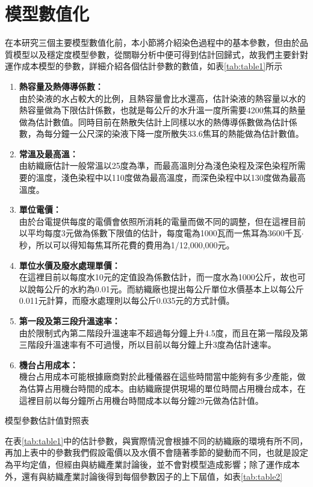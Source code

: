 \section{模型數值化}
\label{c:ch6.1}
在本研究三個主要模型數值化前，本小節將介紹染色過程中的基本參數，但由於品質模型以及穩定度模型參數，從關聯分析中便可得到估計回歸式，故我們主要針對運作成本模型的參數，詳細介紹各個估計參數的數值，如表\ref{tab:table1}所示
\begin{enumerate}[(1)]
	\item \textbf{熱容量及熱傳導係數：}\\由於染液的水占較大的比例，且熱容量會比水還高，估計染液的熱容量以水的熱容量做為下限估計係數，也就是每公斤的水升溫一度所需要4200焦耳的熱量做為估計數值。同時目前在熱散失估計上同樣以水的熱傳導係數做為估計係數，為每分鐘一公尺深的染液下降一度所散失33.6焦耳的熱能做為估計數值。
	\item \textbf{常溫及最高溫：}\\由紡織廠估計一般常溫以25度為準，而最高溫則分為淺色染程及深色染程所需要的溫度，淺色染程中以110度做為最高溫度，而深色染程中以130度做為最高溫度。
	\item \textbf{單位電價：}\\由於台電提供每度的電價會依照所消耗的電量而做不同的調整，但在這裡目前以平均每度3元做為係數下限值的估計，每度電為1000瓦而一焦耳為3600千瓦$\cdot$秒，所以可以得知每焦耳所花費的費用為1/12,000,000元。
	\item \textbf{單位水價及廢水處理單價：}\\在這裡目前以每度水10元的定值設為係數估計，而一度水為1000公斤，故也可以說每公斤的水約為0.01元。而紡織廠也提出每公斤單位水價基本上以每公斤0.011元計算，而廢水處理則以每公斤0.035元的方式計價。
	\item \textbf{第一段及第三段升溫速率：}\\由於限制式內第二階段升溫速率不超過每分鐘上升4.5度，而且在第一階段及第三階段升溫速率有不可過慢，所以目前以每分鐘上升3度為估計速率。
	\item \textbf{機台占用成本：}\\機台占用成本可能根據廠商對於此種儀器在這些時間當中能夠有多少產能，做為估算占用機台時間的成本。由紡織廠提供現場的單位時間占用機台成本，在這裡目前以每分鐘所占用機台時間成本以每分鐘29元做為估計值。
\end{enumerate}
\begin{table}[!htbp]
	\caption{模型參數估計值對照表}
	\center
	
	\label{tab:table1}
\end{table}
\newpage
在表\ref{tab:table1}中的估計參數，與實際情況會根據不同的紡織廠的環境有所不同，再加上表中的參數我們假設電價以及水價不會隨著季節的變動而不同，也就是設定為平均定值，但經由與紡織產業討論後，並不會對模型造成影響；除了運作成本外，還有與紡織產業討論後得到每個參數因子的上下屆值，如表\ref{tab:table2}
